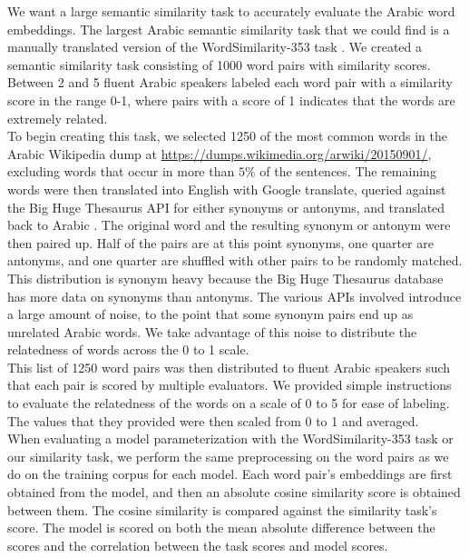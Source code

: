 We want a large semantic similarity task to accurately evaluate the Arabic word embeddings. The largest Arabic semantic similarity task that we could find is a manually translated version of the WordSimilarity-353 task \cite{finkelstein:2001,hassan:2009}. We created a semantic similarity task consisting of 1000 word pairs with similarity scores. Between 2 and 5 fluent Arabic speakers labeled each word pair with a similarity score in the range 0-1, where pairs with a score of 1 indicates that the words are extremely related.
\\
To begin creating this task, we selected 1250 of the most common words in the Arabic Wikipedia dump \cite{wiki:xxx} at \url{https://dumps.wikimedia.org/arwiki/20150901/}, excluding words that occur in more than $5\%$ of the sentences. The remaining words were then translated into English with Google translate, queried against the Big Huge Thesaurus API for either synonyms or antonyms, and translated back to Arabic \cite{google:online,bhl:online}. The original word and the resulting synonym or antonym were then paired up. Half of the pairs are at this point synonyms, one quarter are antonyms, and one quarter are shuffled with other pairs to be randomly matched. This distribution is synonym heavy because the Big Huge Thesaurus database has more data on synonyms than antonyms. The various APIs involved introduce a large amount of noise, to the point that some synonym pairs end up as unrelated Arabic words. We take advantage of this noise to distribute the relatedness of words across the 0 to 1 scale.
\\
This list of 1250 word pairs was then distributed to fluent Arabic speakers such that each pair is scored by multiple evaluators. We provided simple instructions to evaluate the relatedness of the words on a scale of 0 to 5 for ease of labeling. The values that they provided were then scaled from 0 to 1 and averaged. 
\\
When evaluating a model parameterization with the WordSimilarity-353 task or our similarity task, we perform the same preprocessing on the word pairs as we do on the training corpus for each model. Each word pair's embeddings are first obtained from the model, and then an absolute cosine similarity score is obtained between them. The cosine similarity is compared against the similarity task's score. The model is scored on both the mean absolute difference between the scores and the correlation between the task scores and model scores.



